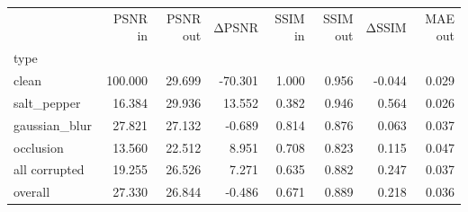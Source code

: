 \begin{tabular}{lrrrrrrr}
\toprule
 & PSNR in & PSNR out & ΔPSNR & SSIM in & SSIM out & ΔSSIM & MAE out \\
type &  &  &  &  &  &  &  \\
\midrule
clean & 100.000 & 29.699 & -70.301 & 1.000 & 0.956 & -0.044 & 0.029 \\
salt_pepper & 16.384 & 29.936 & 13.552 & 0.382 & 0.946 & 0.564 & 0.026 \\
gaussian_blur & 27.821 & 27.132 & -0.689 & 0.814 & 0.876 & 0.063 & 0.037 \\
occlusion & 13.560 & 22.512 & 8.951 & 0.708 & 0.823 & 0.115 & 0.047 \\
all corrupted & 19.255 & 26.526 & 7.271 & 0.635 & 0.882 & 0.247 & 0.037 \\
overall & 27.330 & 26.844 & -0.486 & 0.671 & 0.889 & 0.218 & 0.036 \\
\bottomrule
\end{tabular}
